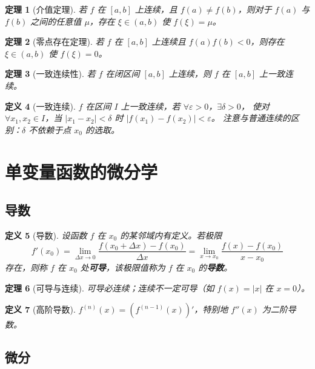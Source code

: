 \documentclass[12pt,a4paper]{ctexart}
\newtheorem{theorem}{定理}[section]
\newtheorem{definition}[theorem]{定义}
\theoremstyle{remark}
\begin{document}
\begin{theorem}[介值定理]
若 $f$ 在 $[a,b]$ 上连续，且 $f(a) \neq f(b)$，则对于 $f(a)$ 与 $f(b)$
之间的任意值 $\mu$，存在 $\xi \in (a,b)$ 使 $f(\xi) = \mu$。
\end{theorem}

\begin{theorem}[零点存在定理]
若 $f$ 在 $[a,b]$ 上连续且 $f(a)f(b) < 0$，则存在 $\xi \in (a,b)$ 使 $f(\xi) = 0$。
\end{theorem}

\begin{theorem}[一致连续性]
若 $f$ 在闭区间 $[a,b]$ 上连续，则 $f$ 在 $[a,b]$ 上一致连续。
\end{theorem}

\begin{definition}[一致连续]
$f$ 在区间 $I$ 上一致连续，若 $\forall \varepsilon > 0$，$\exists \delta > 0$，
使对 $\forall x_1,x_2 \in I$，当 $|x_1-x_2|<\delta$ 时 $|f(x_1)-f(x_2)|<\varepsilon$。
注意与普通连续的区别：$\delta$ 不依赖于点 $x_0$ 的选取。
\end{definition}

\section{单变量函数的微分学}

\subsection{导数}

\begin{definition}[导数]
设函数 $f$ 在 $x_0$ 的某邻域内有定义。若极限
\[
f'(x_0) = \lim_{\Delta x \to 0} \frac{f(x_0+\Delta x)-f(x_0)}{\Delta x}
= \lim_{x \to x_0} \frac{f(x)-f(x_0)}{x-x_0}
\]
存在，则称 $f$ 在 $x_0$ 处\textbf{可导}，该极限值称为 $f$ 在 $x_0$ 的\textbf{导数}。
\end{definition}

\begin{theorem}[可导与连续]
可导必连续；连续不一定可导（如 $f(x)=|x|$ 在 $x=0$）。
\end{theorem}

\begin{definition}[高阶导数]
$f^{(n)}(x) = (f^{(n-1)}(x))'$，特别地 $f''(x)$ 为二阶导数。
\end{definition}

\subsection{微分}
\end{document}
